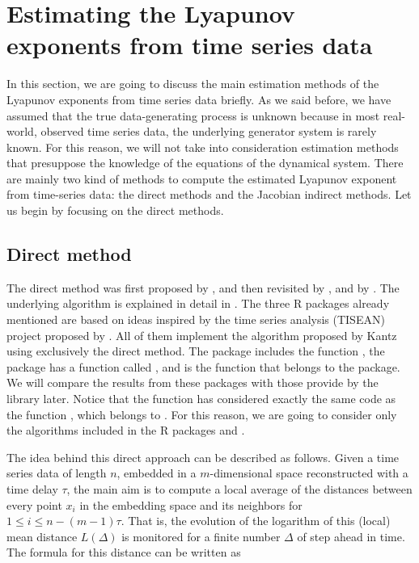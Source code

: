 \section{Estimating the Lyapunov exponents from time series data}

In this section, we are going to discuss the main estimation methods of the Lyapunov exponents from time series data briefly. As we said before, we have assumed that the true data-generating process is unknown because in most real-world, observed time series data, the underlying generator system is rarely known. For this reason, we will not take into consideration estimation methods that presuppose the knowledge of the equations of the dynamical system. There are mainly two kind of methods to compute the estimated Lyapunov exponent from time-series data: the direct methods and the Jacobian indirect methods. Let us begin by focusing on the direct methods.

\subsection{Direct method}

The direct method was first proposed by \cite{Wolf1985}, and then revisited by \cite{Rosenstein1993}, and by \cite{Kantz1994, Kantz2004}. The underlying algorithm is explained in detail in \cite{Kantz1997}. The three R packages already mentioned are based on ideas inspired by the time series analysis (TISEAN) project proposed by \cite{Hegger1999}. All of them implement the algorithm proposed by Kantz using exclusively the direct method. The  package includes the function , the  package has a function called , and  is the function that belongs to the  package. We will compare the results from these packages with those provide by the  library later. Notice that the function  has considered exactly the same code as the function , which belongs to . For this reason, we are going to consider only the algorithms included in the R packages  and . 

The idea behind this direct approach can be described as follows. Given a time series data of length $n$, embedded in a $m$-dimensional space reconstructed with a time delay $\tau$, the main aim is to compute a local average of the distances between every point ${x_i}$ in the embedding space and its neighbors for $1 \leqslant i \leqslant n - \left( {m - 1} \right)\tau$. That is, the evolution of the logarithm of this (local) mean distance $L\left( \Delta  \right)$ is monitored for a finite number ${\Delta}$ of step ahead in time. The formula for this distance can be written as 

